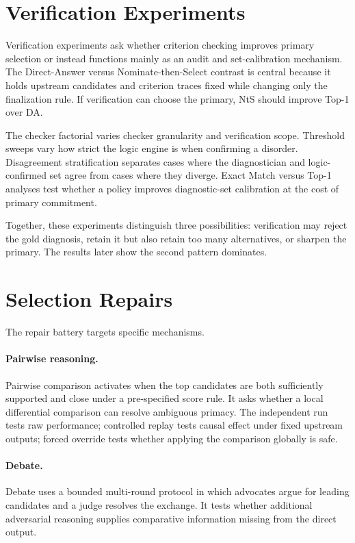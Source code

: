 \section{Verification Experiments}

Verification experiments ask whether criterion checking improves primary selection or instead functions mainly as an audit and set-calibration mechanism. The Direct-Answer versus Nominate-then-Select contrast is central because it holds upstream candidates and criterion traces fixed while changing only the finalization rule. If verification can choose the primary, NtS should improve Top-1 over DA.

The checker factorial varies checker granularity and verification scope. Threshold sweeps vary how strict the logic engine is when confirming a disorder. Disagreement stratification separates cases where the diagnostician and logic-confirmed set agree from cases where they diverge. Exact Match versus Top-1 analyses test whether a policy improves diagnostic-set calibration at the cost of primary commitment.

Together, these experiments distinguish three possibilities: verification may reject the gold diagnosis, retain it but also retain too many alternatives, or sharpen the primary. The results later show the second pattern dominates.

\section{Selection Repairs}

The repair battery targets specific mechanisms.

\paragraph{Pairwise reasoning.} Pairwise comparison activates when the top candidates are both sufficiently supported and close under a pre-specified score rule. It asks whether a local differential comparison can resolve ambiguous primacy. The independent run tests raw performance; controlled replay tests causal effect under fixed upstream outputs; forced override tests whether applying the comparison globally is safe.

\paragraph{Debate.} Debate uses a bounded multi-round protocol in which advocates argue for leading candidates and a judge resolves the exchange. It tests whether additional adversarial reasoning supplies comparative information missing from the direct output.

